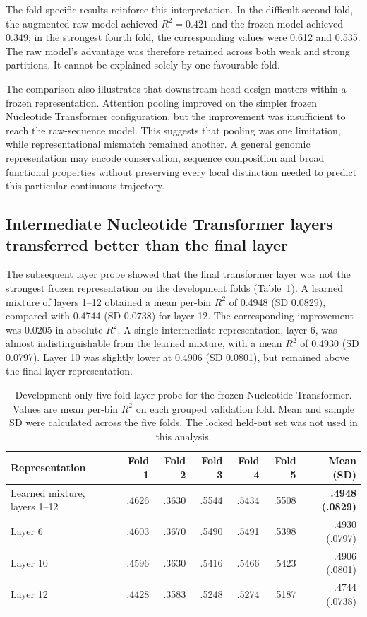 \documentclass[a4paper,12pt]{article}
\begin{document}
The fold-specific results reinforce this interpretation. In the difficult second fold, the augmented raw model achieved $R^2=0.421$ and the frozen model achieved 0.349; in the strongest fourth fold, the corresponding values were 0.612 and 0.535. The raw model's advantage was therefore retained across both weak and strong partitions. It cannot be explained solely by one favourable fold.

The comparison also illustrates that downstream-head design matters within a frozen representation. Attention pooling improved on the simpler frozen Nucleotide Transformer configuration, but the improvement was insufficient to reach the raw-sequence model. This suggests that pooling was one limitation, while representational mismatch remained another. A general genomic representation may encode conservation, sequence composition and broad functional properties without preserving every local distinction needed to predict this particular continuous trajectory.

\subsection{Intermediate Nucleotide Transformer layers transferred better than the final layer}

The subsequent layer probe showed that the final transformer layer was not the strongest frozen representation on the development folds (Table~\ref{tab:ntlayers}). A learned mixture of layers 1--12 obtained a mean per-bin $R^2$ of 0.4948 (SD 0.0829), compared with 0.4744 (SD 0.0738) for layer 12. The corresponding improvement was 0.0205 in absolute $R^2$. A single intermediate representation, layer 6, was almost indistinguishable from the learned mixture, with a mean $R^2$ of 0.4930 (SD 0.0797). Layer 10 was slightly lower at 0.4906 (SD 0.0801), but remained above the final-layer representation.

\begin{table}[htbp]
\centering
\caption{Development-only five-fold layer probe for the frozen Nucleotide Transformer. Values are mean per-bin $R^2$ on each grouped validation fold. Mean and sample SD were calculated across the five folds. The locked held-out set was not used in this analysis.}
\label{tab:ntlayers}
\small
\begin{tabular}{lrrrrrr}
\toprule
Representation & Fold 1 & Fold 2 & Fold 3 & Fold 4 & Fold 5 & Mean (SD) \\
\midrule
Learned mixture, layers 1--12 & .4626 & .3630 & .5544 & .5434 & .5508 & \textbf{.4948 (.0829)} \\
Layer 6 & .4603 & .3670 & .5490 & .5491 & .5398 & .4930 (.0797) \\
Layer 10 & .4596 & .3630 & .5416 & .5466 & .5423 & .4906 (.0801) \\
Layer 12 & .4428 & .3583 & .5248 & .5274 & .5187 & .4744 (.0738) \\
\bottomrule
\end{tabular}
\end{table}
\end{document}
